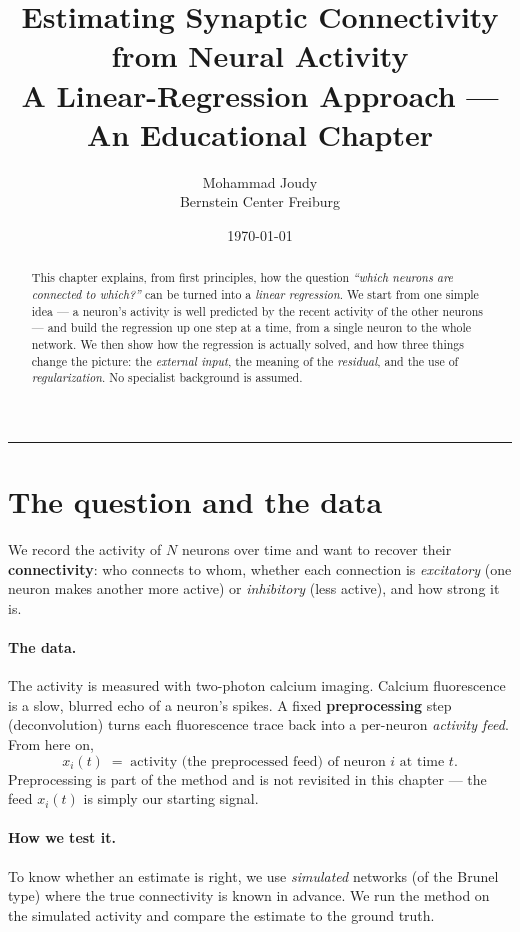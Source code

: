 \documentclass[11pt,a4paper]{article}
\title{\textbf{Estimating Synaptic Connectivity from Neural Activity}\\[4pt]
\large A Linear-Regression Approach --- An Educational Chapter}
\author{Mohammad Joudy \\ \small Bernstein Center Freiburg}
\date{\today}
\begin{document}
\maketitle

\begin{abstract}
\noindent
This chapter explains, from first principles, how the question
\emph{``which neurons are connected to which?''} can be turned into a
\emph{linear regression}. We start from one simple idea --- a neuron's
activity is well predicted by the recent activity of the other neurons --- and
build the regression up one step at a time, from a single neuron to the whole
network. We then show how the regression is actually solved, and how three
things change the picture: the \emph{external input}, the meaning of the
\emph{residual}, and the use of \emph{regularization}. No specialist
background is assumed.
\end{abstract}

\tableofcontents
\vspace{1em}
\hrule
\vspace{1em}

\section{The question and the data}

We record the activity of $N$ neurons over time and want to recover their
\textbf{connectivity}: who connects to whom, whether each connection is
\emph{excitatory} (one neuron makes another more active) or \emph{inhibitory}
(less active), and how strong it is.

\paragraph{The data.}
The activity is measured with two-photon calcium imaging. Calcium fluorescence
is a slow, blurred echo of a neuron's spikes. A fixed \textbf{preprocessing}
step (deconvolution) turns each fluorescence trace back into a per-neuron
\emph{activity feed}. From here on,
\[
x_i(t) \;=\; \text{activity (the preprocessed feed) of neuron } i \text{ at time } t .
\]
Preprocessing is part of the method and is not revisited in this chapter --- the
feed $x_i(t)$ is simply our starting signal.

\paragraph{How we test it.}
To know whether an estimate is right, we use \emph{simulated} networks (of the
Brunel type) where the true connectivity is known in advance. We run the method
on the simulated activity and compare the estimate to the ground truth.
\end{document}
